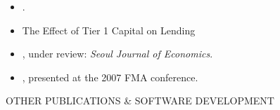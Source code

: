 \documentclass[9pt]{article}
\begin{document}
\begin{itemize}[noitemsep, nolistsep]
\item \href{https://papers.ssrn.com/sol3/papers.cfm?abstract_id=3125788}{\color{Blue}{Trade Intensity and Liquidity}}.
\item The Effect of Tier 1 Capital on Lending
\item \href{http://complete-markets.com/wp-content/uploads/2014/07/Performance_measures_June_2014.pdf}{\color{Blue}{How Consistent are the Judges of Portfolio Performance?}}, under review: {\it Seoul Journal of Economics}.
\item \href{https://docs.google.com/file/d/0B46EsGCAlLnPdmxsT3ZtVGk5Wkk/edit?usp=sharing}{\color{Blue}{Almost Stochastic Dominance: A Penchant for Risk}}, presented at the 2007 FMA conference.
\end{itemize}
\vspace{10pt}
OTHER PUBLICATIONS \& SOFTWARE DEVELOPMENT
\end{document}
